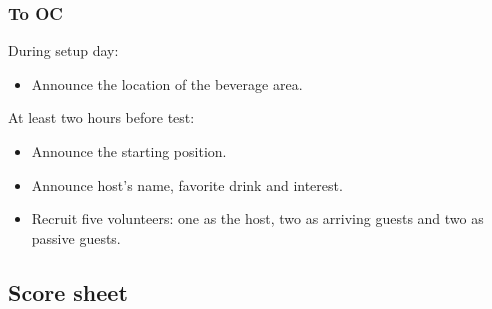 \subsubsection*{To OC}


During setup day:
\begin{itemize}
	\item Announce the location of the beverage area.
\end{itemize}


At least two hours before test:
\begin{itemize}
	\item Announce the starting position.
	\item Announce host's name, favorite drink and interest.
	\item Recruit five volunteers: one as the host, two as arriving guests and two as passive guests.

\end{itemize}

\subsection*{Score sheet}

